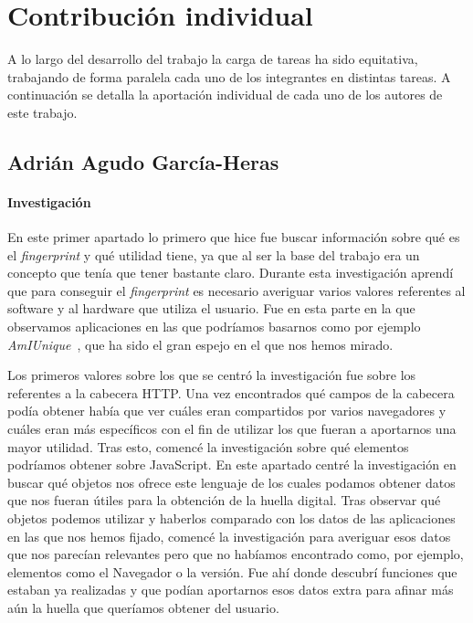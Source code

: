 \chapter{Contribución individual}
A lo largo del desarrollo del trabajo la carga de tareas ha sido equitativa, trabajando de forma paralela cada uno de los integrantes en distintas tareas. A continuación se detalla la aportación individual de cada uno de los autores de este trabajo.

\section{Adrián Agudo García-Heras}
\subsubsection{Investigación}
En este primer apartado lo primero que hice fue buscar información sobre qué es el \textit{fingerprint} y qué utilidad tiene, ya que al ser la base del trabajo era un concepto que tenía que tener bastante claro. Durante esta investigación aprendí que para conseguir el \textit{fingerprint} es necesario averiguar varios valores referentes al software y al hardware que utiliza el usuario. Fue en esta parte en la que observamos aplicaciones en las que podríamos basarnos como por ejemplo \textit{AmIUnique}~\cite{amiunique}, que ha sido el gran espejo en el que nos hemos mirado. \par
Los primeros valores sobre los que se centró la investigación fue sobre los referentes a la cabecera HTTP. Una vez encontrados qué campos de la cabecera podía obtener había que ver cuáles eran compartidos por varios navegadores y cuáles eran más específicos con el fin de utilizar los que fueran a aportarnos una mayor utilidad.
Tras esto, comencé la investigación sobre qué elementos podríamos obtener sobre JavaScript. En este apartado centré la investigación en buscar qué objetos nos ofrece este lenguaje de los cuales podamos obtener datos que nos fueran útiles para la obtención de la huella digital. Tras observar qué objetos podemos utilizar y haberlos comparado con los datos de las aplicaciones en las que nos hemos fijado, comencé la investigación para averiguar esos datos que nos parecían relevantes pero que no habíamos encontrado como, por ejemplo, elementos como el Navegador o la versión. Fue ahí donde descubrí funciones que estaban ya realizadas y que podían aportarnos esos datos extra para afinar más aún la huella que queríamos obtener del usuario.

